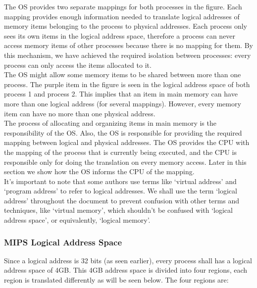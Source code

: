 \documentclass[oneside]{book}
\begin{document}
The OS provides two separate mappings for both processes in the figure.
Each mapping provides enough information needed to translate
logical addresses of memory items belonging to the process to
physical addresses. Each process only sees its own items in the
logical address space, therefore a process can never access
memory items of other processes because there is no mapping for them.
By this mechanism, we have achieved the required isolation between
processes: every process can only access the items allocated to it.\\

The OS might allow some memory items to be shared between more
than one process. The purple item in the figure is seen in the
logical address space of both process 1 and process 2. This implies
that an item in main memory can have more than one logical address (for
several mappings). However, every memory item can have no more than
one physical address.\\

The process of allocating and organizing items in main memory is the
responsibility of the OS. Also, the OS is responsible for providing
the required mapping between logical and physical addresses. The OS
provides the CPU with the mapping of the process that is currently
being executed, and the CPU is responsible only for doing the translation
on every memory access. Later in this section we show how the OS
informs the CPU of the mapping. \\

It's important to note that some authors use terms like
`virtual address' and `program address' to refer to logical addresses.
We shall use the term `logical address' throughout the document to
prevent confusion with other terms and techniques, like `virtual memory',
which shouldn't be confused with `logical address space', or equivalently,
`logical memory'.\\

\subsubsection{MIPS Logical Address Space}

Since a logical address is 32 bits (as seen earlier), every process
shall has a logical address space of 4GB. This 4GB address space
is divided into four regions, each region is translated differently
as will be seen below. The four regions are:
\end{document}
